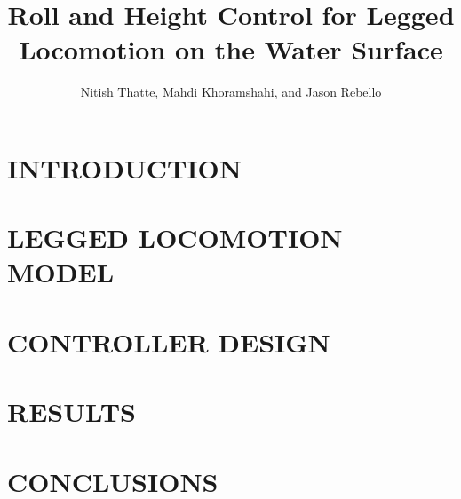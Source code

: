 \documentclass[letterpaper, 11 pt, conference]{ieeeconf}  %
\title{\LARGE \bf
    Roll and Height Control for Legged Locomotion on the Water Surface
}
\author{Nitish Thatte, Mahdi Khoramshahi, and Jason Rebello}
\begin{document}
\maketitle
\thispagestyle{empty}
\pagestyle{empty}

\begin{abstract}
	
\end{abstract}

\section{INTRODUCTION}


\section{LEGGED LOCOMOTION MODEL}


\section{CONTROLLER DESIGN}


\section{RESULTS}


\section{CONCLUSIONS}






\end{document}
